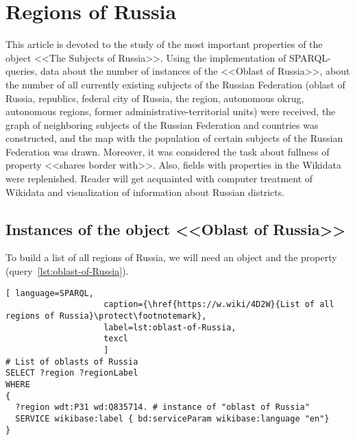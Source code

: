 \chapter{Regions of Russia}
\label{ch:oblast-of-Russia}
This article is devoted to the study of the most important properties of 
the object <<The Subjects of Russia>>. Using the implementation of SPARQL-queries, 
data about the number of instances of the <<Oblast of Russia>>, about the number of 
all currently existing subjects of the Russian Federation (oblast of Russia, republics, 
federal city of Russia, the region, autonomous okrug, autonomous regions, former 
administrative-territorial units) were received, the graph of neighboring subjects 
of the Russian Federation and countries was constructed, and the map with the population 
of certain subjects of the Russian Federation was drawn. Moreover, it was considered the 
task about fullness of property <<shares border with>>. Also, fields with properties in the 
Wikidata were replenished. Reader will get acquainted with computer treatment of Wikidata 
and visualization of information about Russian districts.

\label{question:q_subjects_of_Russia_3}

\section{Instances of the object <<Oblast of Russia>>}

To build a list of all regions of Russia, we will need an object 
 and the property 
(query~\protect\ref{lst:oblast-of-Russia}).

\begin{lstlisting}[ language=SPARQL, 
                    caption={\href{https://w.wiki/4D2W}{List of all regions of Russia}\protect\footnotemark},
                    label=lst:oblast-of-Russia,
                    texcl 
                    ]
# List of oblasts of Russia
SELECT ?region ?regionLabel
WHERE
{
  ?region wdt:P31 wd:Q835714. # instance of "oblast of Russia"
  SERVICE wikibase:label { bd:serviceParam wikibase:language "en"}
}
\end{lstlisting}%


